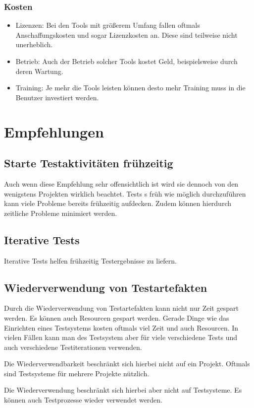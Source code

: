 \subsection{Kosten}
\begin{itemize}
	\item Lizenzen: Bei den Tools mit gr\"o\ss{}erem Umfang fallen oftmals Anschaffungskosten und sogar Lizenzkosten an. Diese sind teilweise nicht unerheblich.
	\item Betrieb: Auch der Betrieb solcher Tools kostet Geld, beispielsweise durch deren Wartung.
	\item Training: Je mehr die Tools leisten k\"onnen desto mehr Training muss in die Benutzer investiert werden.
\end{itemize}

\chapter{Empfehlungen}
\section{Starte Testaktivit\"aten fr\"uhzeitig}
Auch wenn diese Empfehlung sehr offensichtlich ist wird sie dennoch von den wenigstens Projekten wirklich beachtet. Tests s fr\"uh wie m\"oglich durchzuf\"uhren kann viele Probleme bereits fr\"uhzeitig aufdecken. Zudem k\"onnen hierdurch zeitliche Probleme minimiert werden.

\section{Iterative Tests}
Iterative Tests helfen fr\"uhzeitig Testergebnisse zu liefern.

\section{Wiederverwendung von Testartefakten}
Durch die Wiederverwendung von Testartefakten kann nicht nur Zeit gespart werden. Es k\"onnen auch Resourcen gespart werden. Gerade Dinge wie das Einrichten eines Testsystems kosten oftmals viel Zeit und auch Resourcen. In vielen F\"allen kann man des Testsystem aber f\"ur viele verschiedene Tests und auch verschiedene Testiterationen verwenden.

Die Wiederverwendbarkeit beschr\"ankt sich hierbei nicht auf ein Projekt. Oftmals sind Testsysteme f\"ur mehrere Projekte n\"utzlich. 

Die Wiederverwendung beschr\"ankt sich hierbei aber nicht auf Testsysteme. Es k\"onnen auch Testprozesse wieder verwendet werden.

